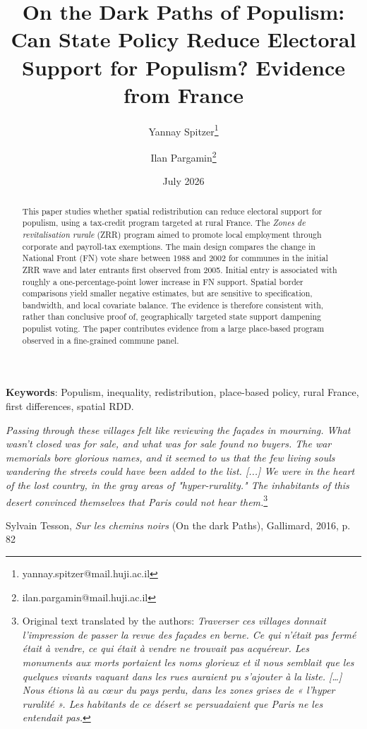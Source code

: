 \documentclass[12pt,a4paper]{article}
\title{On the Dark Paths of Populism: Can State Policy Reduce Electoral Support for Populism? Evidence from France}
\author{
  Yannay Spitzer\thanks{yannay.spitzer@mail.huji.ac.il} \and 
  Ilan Pargamin\thanks{ilan.pargamin@mail.huji.ac.il}
}
\affil{\small Hebrew University of Jerusalem}
\date{July 2026}
\begin{document}
\maketitle

\begin{abstract}


This paper studies whether spatial redistribution can reduce electoral support for populism, using a tax-credit program targeted at rural France. The \textit{Zones de revitalisation rurale} (ZRR) program aimed to promote local employment through corporate and payroll-tax exemptions. The main design compares the change in National Front (FN) vote share between 1988 and 2002 for communes in the initial ZRR wave and later entrants first observed from 2005. Initial entry is associated with roughly a one-percentage-point lower increase in FN support. Spatial border comparisons yield smaller negative estimates, but are sensitive to specification, bandwidth, and local covariate balance. The evidence is therefore consistent with, rather than conclusive proof of, geographically targeted state support dampening populist voting. The paper contributes evidence from a large place-based program observed in a fine-grained commune panel.


\end{abstract}

\textbf{Keywords}: Populism, inequality, redistribution, place-based policy, rural France, first differences, spatial RDD.
\newpage


\small{
\textit{Passing through these villages felt like reviewing the façades in mourning. What wasn't closed was for sale, and what was for sale found no buyers. The war memorials bore glorious names, and it seemed to us that the few living souls wandering the streets could have been added to the list. [...] We were in the heart of the lost country, in the gray areas of "hyper-rurality." The inhabitants of this desert convinced themselves that Paris could not hear them.}\footnote{Original text translated by the authors: \textit{Traverser ces villages donnait l'impression de passer la revue des façades en berne. Ce qui n'était pas fermé était à vendre, ce qui était à vendre ne trouvait pas acquéreur. Les monuments aux morts portaient les noms glorieux et il nous semblait que les quelques vivants vaquant dans les rues auraient pu s'ajouter à la liste. […] Nous étions là au cœur du pays perdu, dans les zones grises de « l'hyper ruralité ». Les habitants de ce désert se persuadaient que Paris ne les entendait pas.}}

		Sylvain Tesson, \textit{Sur les chemins noirs} (On the dark Paths), Gallimard, 2016, p. 82}
\end{document}
